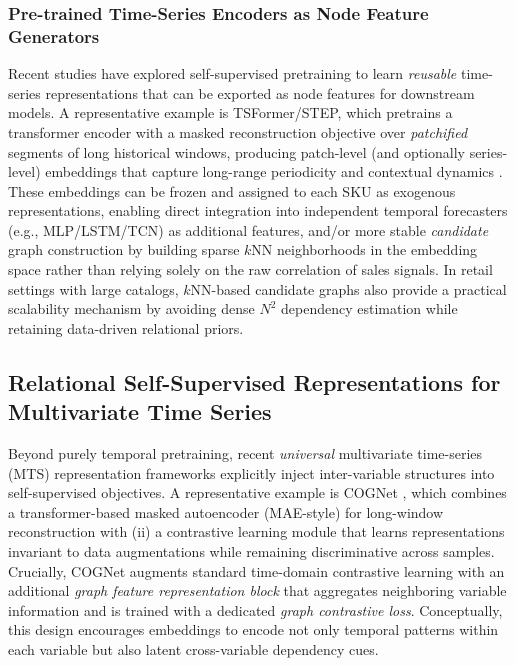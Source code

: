 \subsubsection{Pre-trained Time-Series Encoders as Node Feature Generators}
Recent studies have explored self-supervised pretraining to learn \emph{reusable} time-series representations that can be exported as node features for downstream models. A representative example is TSFormer/STEP, which pretrains a transformer encoder with a masked reconstruction objective over \emph{patchified} segments of long historical windows, producing patch-level (and optionally series-level) embeddings that capture long-range periodicity and contextual dynamics \cite{10.1145/3534678.3539396}. These embeddings can be frozen and assigned to each SKU as exogenous representations, enabling   direct integration into independent temporal forecasters (e.g., MLP/LSTM/TCN) as additional features, and/or more stable \emph{candidate} graph construction by building sparse $k$NN neighborhoods in the embedding space rather than relying solely on the raw correlation of sales signals. In retail settings with large catalogs, $k$NN-based candidate graphs also provide a practical scalability mechanism by avoiding dense $N^2$ dependency estimation while retaining data-driven relational priors.

\subsection{Relational Self-Supervised Representations for Multivariate Time Series}
\label{ss:relational-ssl-mts}

Beyond purely temporal pretraining, recent \emph{universal} multivariate time-series (MTS) representation frameworks explicitly inject inter-variable structures into self-supervised objectives. A representative example is COGNet \cite{wang2024cognet}, which combines   a transformer-based masked autoencoder (MAE-style) for long-window reconstruction with (ii) a contrastive learning module that learns representations invariant to data augmentations while remaining discriminative across samples. Crucially, COGNet augments standard time-domain contrastive learning with an additional \emph{graph feature representation block} that aggregates neighboring variable information and is trained with a dedicated \emph{graph contrastive loss}. Conceptually, this design encourages embeddings to encode not only temporal patterns within each variable but also latent cross-variable dependency cues.

